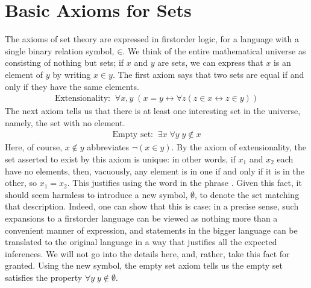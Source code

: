 \documentclass[letterpaper,10pt,english]{sphinxmanual}
\begin{document}
\section{Basic Axioms for Sets}
\label{\detokenize{axiomatic_foundations:basic-axioms-for-sets}}\label{\detokenize{axiomatic_foundations:id2}}
\sphinxAtStartPar
The axioms of set theory are expressed in first\sphinxhyphen{}order logic, for a language with a single binary relation symbol, \(\mathord{\in}\). We think of the entire mathematical universe as consisting of nothing but sets; if \(x\) and \(y\) are sets, we can express that \(x\) is an element of \(y\) by writing \(x \in y\). The first axiom says that two sets are equal if and only if they have the same elements.
\begin{equation*}
\begin{split}\text{Extensionality:} \;\; \forall x, y \; (x = y \leftrightarrow \forall z (z \in x \leftrightarrow z \in y))\end{split}
\end{equation*}
\sphinxAtStartPar
The next axiom tells us that there is at least one interesting set in the universe, namely, the set with no element.
\begin{equation*}
\begin{split}\text{Empty set:} \;\; \exists x \; \forall y \; y \notin x\end{split}
\end{equation*}
\sphinxAtStartPar
Here, of course, \(x \notin y\) abbreviates \(\neg (x \in y)\). By the axiom of extensionality, the set asserted to exist by this axiom is unique: in other words, if \(x_1\) and \(x_2\) each have no elements, then, vacuously, any element is in one if and only if it is in the other, so \(x_1 = x_2\). This justifies using the word  in the phrase . Given this fact, it should seem harmless to introduce a new symbol, \(\emptyset\), to denote the set matching that description. Indeed, one can show that this is case: in a precise sense, such expansions to a first\sphinxhyphen{}order language can be viewed as nothing more than a convenient manner of expression, and statements in the bigger language can be translated to the original language in a way that justifies all the expected inferences. We will not go into the details here, and, rather, take this fact for granted. Using the new symbol, the empty set axiom tells us the empty set satisfies the property \(\forall y \; y \notin \emptyset\).
\end{document}
